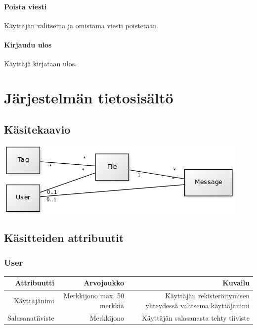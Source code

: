 \documentclass[10pt,a4paper]{article}
\begin{document}
\paragraph{Poista viesti}
Käyttäjän valitsema ja omistama viesti poistetaan.

\paragraph{Kirjaudu ulos}
Käyttäjä kirjataan ulos.

\section{Järjestelmän tietosisältö}
\subsection{Käsitekaavio}
\includegraphics[scale=0.7]{kaaviot/kasitekaavio.png}
\subsection{Käsitteiden attribuutit}
\subsubsection{User}
\begin{tabularx}{\textwidth}{|R|R|R|} \hline
\textbf{Attribuutti} & \textbf{Arvojoukko} & \textbf{Kuvailu}\\ \hline
Käyttäjänimi & Merkkijono max. 50 merkkiä & Käyttäjän rekisteröitymisen yhteydessä valitsema käyttäjänimi\\ \hline
Salasanatiiviste & Merkkijono & Käyttäjän salasanasta tehty tiiviste\\ \hline
\end{tabularx}
\end{document}
